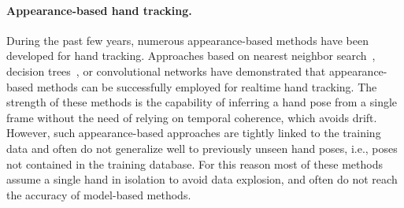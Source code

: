 







\paragraph*{Appearance-based hand tracking.} 
During the past few years, numerous appearance-based methods have been developed for hand tracking. Approaches based on nearest neighbor search~\cite{wang_sig09,wang_uist11,romero_13}, decision trees~\cite{keskin_eccv12,tang_iccv13,tang_cvpr14,krupka_cvpr14}, or convolutional networks \cite{tompson_tog14} have demonstrated that appearance-based methods can be successfully employed for realtime hand tracking. The strength of these methods is the capability of inferring a hand pose from a single frame without the need of relying on temporal coherence, which avoids drift.
 However, such appearance-based approaches are tightly linked to the training data and often do not generalize well to previously unseen hand poses, i.e., poses not contained in the training database. For this reason most of these methods assume a single hand in isolation to avoid data explosion, and often do not reach the accuracy of model-based methods.

